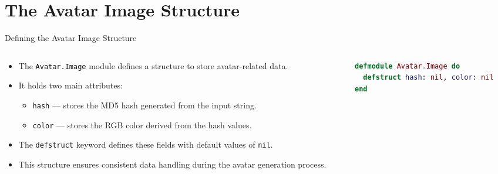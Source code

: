 \documentclass[aspectratio=169, table]{beamer}
\begin{document}
\section{The Avatar Image Structure}
\begin{frame}[fragile]{Defining the Avatar Image Structure}
\vspace{10pt}
\small
\begin{columns}[T,totalwidth=\textwidth]
  \begin{column}{0.5\textwidth}
    \begin{itemize}
      \item The \texttt{Avatar.Image} module defines a structure to store avatar-related data.
      \item It holds two main attributes:
      \begin{itemize}
        \item \texttt{hash} — stores the MD5 hash generated from the input string.
        \item \texttt{color} — stores the RGB color derived from the hash values.
      \end{itemize}
      \item The \texttt{defstruct} keyword defines these fields with default values of \texttt{nil}.
      \item This structure ensures consistent data handling during the avatar generation process.
    \end{itemize}
  \end{column}

  \begin{column}{0.4\textwidth}
    \begin{lstlisting}[language=Elixir, 
      caption={Defining the Avatar Image structure in \texttt{lib/image.ex}}, 
      basicstyle=\ttfamily\small]
defmodule Avatar.Image do
  defstruct hash: nil, color: nil
end
    \end{lstlisting}
  \end{column}
\end{columns}
\end{frame}
\end{document}
